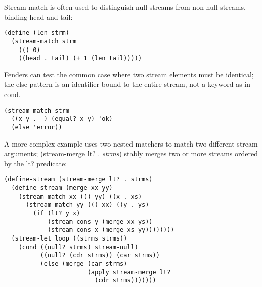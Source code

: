 \begin{entry}{%
  }
Stream-match is often used to distinguish null streams from non-null
streams, binding head and tail:

\begin{verbatim}
(define (len strm)
  (stream-match strm
    (() 0)
    ((head . tail) (+ 1 (len tail)))))
\end{verbatim}

Fenders can test the common case where two stream elements must be
identical; the else pattern is an identifier bound to the entire
stream, not a keyword as in cond.

\begin{verbatim}
(stream-match strm
  ((x y . _) (equal? x y) 'ok)
  (else 'error))
\end{verbatim}

A more complex example uses two nested matchers to match two different
stream arguments; (stream-merge lt? . \emph{strms}) stably merges two
or more streams ordered by the lt? predicate:

\begin{verbatim}
(define-stream (stream-merge lt? . strms)
  (define-stream (merge xx yy)
    (stream-match xx (() yy) ((x . xs)
      (stream-match yy (() xx) ((y . ys)
        (if (lt? y x)
            (stream-cons y (merge xx ys))
            (stream-cons x (merge xs yy))))))))
  (stream-let loop ((strms strms))
    (cond ((null? strms) stream-null)
          ((null? (cdr strms)) (car strms))
          (else (merge (car strms)
                       (apply stream-merge lt?
                         (cdr strms)))))))
\end{verbatim}
\end{entry}

